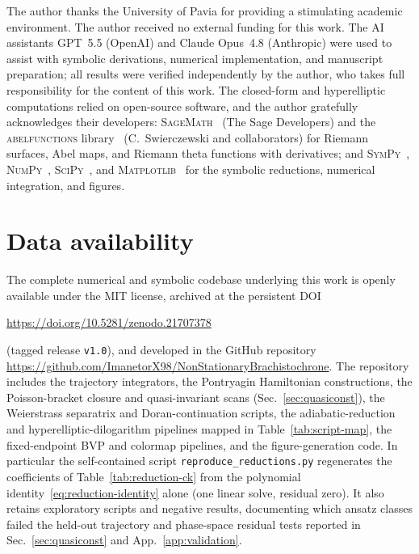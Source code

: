 \documentclass[
    aps, prd, twocolumn, superscriptaddress,
    showpacs, nofootinbib, floatfix
]{revtex4-2}
\begin{document}
\clearpage

\begin{acknowledgments}
The author thanks the University of Pavia for providing a stimulating academic
environment. The author received no external funding for this work. The AI
assistants GPT~5.5 (OpenAI) and Claude Opus~4.8 (Anthropic) were used to assist with
symbolic derivations, numerical implementation, and manuscript preparation; all
results were verified independently by the author, who takes full responsibility
for the content of this work. The closed-form and hyperelliptic computations relied
on open-source software, and the author gratefully acknowledges their developers:
\textsc{SageMath}~\cite{SageMath} (The Sage Developers) and the
\textsc{abelfunctions} library~\cite{abelfunctions} (C.~Swierczewski and
collaborators) for Riemann surfaces, Abel maps, and Riemann theta functions with
derivatives; and \textsc{SymPy}~\cite{SymPy}, \textsc{NumPy}~\cite{NumPy},
\textsc{SciPy}~\cite{SciPy}, and \textsc{Matplotlib}~\cite{Matplotlib} for the
symbolic reductions, numerical integration, and figures.
\end{acknowledgments}

\section*{Data availability}
The complete numerical and symbolic codebase underlying this work is openly
available under the MIT license, archived at the persistent
DOI~\cite{Rosignoli2026Code}
\begin{center}
\url{https://doi.org/10.5281/zenodo.21707378}
\end{center}
(tagged release \texttt{v1.0}), and developed in the GitHub repository
\url{https://github.com/ImanetorX98/NonStationaryBrachistochrone}.
The repository includes the trajectory integrators, the Pontryagin Hamiltonian
constructions, the Poisson-bracket closure and quasi-invariant scans
(Sec.~\ref{sec:quasiconst}), the Weierstrass separatrix and Doran-continuation
scripts, the adiabatic-reduction and hyperelliptic-dilogarithm pipelines mapped in
Table~\ref{tab:script-map}, the fixed-endpoint BVP and colormap pipelines, and the
figure-generation code. In particular the self-contained script
\texttt{reproduce\_reductions.py} regenerates the coefficients of
Table~\ref{tab:reduction-ck} from the polynomial
identity~\eqref{eq:reduction-identity} alone (one linear solve, residual zero). It
also retains exploratory scripts and negative results,
documenting which ansatz classes failed the held-out trajectory and phase-space
residual tests reported in Sec.~\ref{sec:quasiconst} and
App.~\ref{app:validation}.
\end{document}
